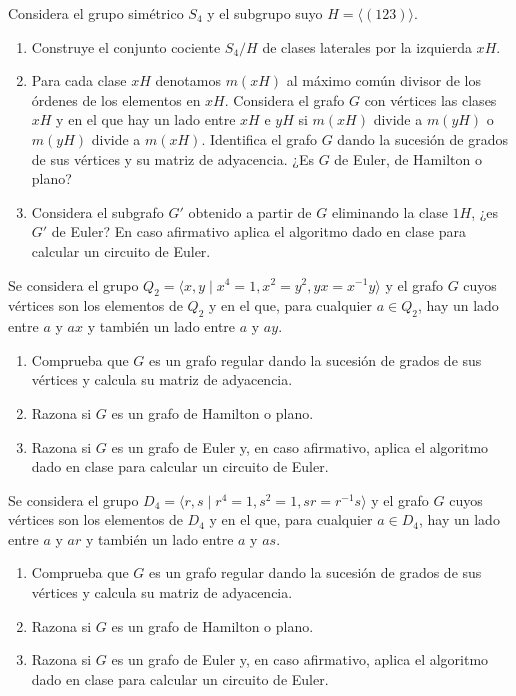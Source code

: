 \begin{ejercicio}\label{ej:1.32}
    Considera el grupo simétrico $S_4$ y el subgrupo suyo $H = \langle (1 2 3) \rangle$.
    \begin{enumerate}
        \item Construye el conjunto cociente $S_4/H$ de clases laterales por la izquierda $xH$.
        \item Para cada clase $xH$ denotamos $m(xH)$ al máximo común divisor de los órdenes de los elementos en $xH$. Considera el grafo $G$ con vértices las clases $xH$ y en el que hay un lado entre $xH$ e $yH$ si $m(xH)$ divide a $m(yH)$ o $m(yH)$ divide a $m(xH)$. Identifica el grafo $G$ dando la sucesión de grados de sus vértices y su matriz de adyacencia. ¿Es $G$ de Euler, de Hamilton o plano?
        \item Considera el subgrafo $G'$ obtenido a partir de $G$ eliminando la clase $1H$, ¿es $G'$ de Euler? En caso afirmativo aplica el algoritmo dado en clase para calcular un circuito de Euler.
    \end{enumerate}
\end{ejercicio}

\begin{ejercicio}\label{ej:1.33}
    Se considera el grupo $Q_2 = \langle x, y \mid x^4 = 1, x^2 = y^2, yx = x^{-1}y \rangle$ y el grafo $G$ cuyos vértices son los elementos de $Q_2$ y en el que, para cualquier $a \in Q_2$, hay un lado entre $a$ y $ax$ y también un lado entre $a$ y $ay$.
    \begin{enumerate}
        \item Comprueba que $G$ es un grafo regular dando la sucesión de grados de sus vértices y calcula su matriz de adyacencia.
        \item Razona si $G$ es un grafo de Hamilton o plano.
        \item Razona si $G$ es un grafo de Euler y, en caso afirmativo, aplica el algoritmo dado en clase para calcular un circuito de Euler.
    \end{enumerate}
\end{ejercicio}

\begin{ejercicio}\label{ej:1.34}
    Se considera el grupo $D_4 = \langle r, s \mid r^4 = 1, s^2 = 1, sr = r^{-1}s \rangle$ y el grafo $G$ cuyos vértices son los elementos de $D_4$ y en el que, para cualquier $a \in D_4$, hay un lado entre $a$ y $ar$ y también un lado entre $a$ y $as$.
    \begin{enumerate}
        \item Comprueba que $G$ es un grafo regular dando la sucesión de grados de sus vértices y calcula su matriz de adyacencia.
        \item Razona si $G$ es un grafo de Hamilton o plano.
        \item Razona si $G$ es un grafo de Euler y, en caso afirmativo, aplica el algoritmo dado en clase para calcular un circuito de Euler.
    \end{enumerate}
\end{ejercicio}


